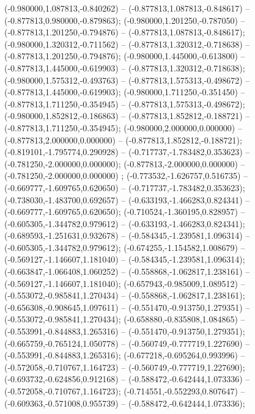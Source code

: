  (-0.980000,1.087813,-0.840262) -- (-0.877813,1.087813,-0.848617) -- (-0.877813,0.980000,-0.879863);
 (-0.980000,1.201250,-0.787050) -- (-0.877813,1.201250,-0.794876) -- (-0.877813,1.087813,-0.848617);
 (-0.980000,1.320312,-0.711562) -- (-0.877813,1.320312,-0.718638) -- (-0.877813,1.201250,-0.794876);
 (-0.980000,1.445000,-0.613800) -- (-0.877813,1.445000,-0.619903) -- (-0.877813,1.320312,-0.718638);
 (-0.980000,1.575312,-0.493763) -- (-0.877813,1.575313,-0.498672) -- (-0.877813,1.445000,-0.619903);
 (-0.980000,1.711250,-0.351450) -- (-0.877813,1.711250,-0.354945) -- (-0.877813,1.575313,-0.498672);
 (-0.980000,1.852812,-0.186863) -- (-0.877813,1.852812,-0.188721) -- (-0.877813,1.711250,-0.354945);
 (-0.980000,2.000000,0.000000) -- (-0.877813,2.000000,0.000000) -- (-0.877813,1.852812,-0.188721);
 (-0.819101,-1.795774,0.290928) -- (-0.717737,-1.783482,0.353623) -- (-0.781250,-2.000000,0.000000);
 (-0.877813,-2.000000,0.000000) -- (-0.781250,-2.000000,0.000000) ;
 (-0.773532,-1.626757,0.516735) -- (-0.669777,-1.609765,0.620650) -- (-0.717737,-1.783482,0.353623);
 (-0.738030,-1.483700,0.692657) -- (-0.633193,-1.466283,0.824341) -- (-0.669777,-1.609765,0.620650);
 (-0.710524,-1.360195,0.828957) -- (-0.605305,-1.344782,0.979612) -- (-0.633193,-1.466283,0.824341);
 (-0.689593,-1.251631,0.932678) -- (-0.584345,-1.239581,1.096314) -- (-0.605305,-1.344782,0.979612);
 (-0.674255,-1.154582,1.008679) -- (-0.569127,-1.146607,1.181040) -- (-0.584345,-1.239581,1.096314);
 (-0.663847,-1.066408,1.060252) -- (-0.558868,-1.062817,1.238161) -- (-0.569127,-1.146607,1.181040);
 (-0.657943,-0.985009,1.089512) -- (-0.553072,-0.985841,1.270434) -- (-0.558868,-1.062817,1.238161);
 (-0.656308,-0.908645,1.097611) -- (-0.551470,-0.913750,1.279351) -- (-0.553072,-0.985841,1.270434);
 (-0.658880,-0.835808,1.084865) -- (-0.553991,-0.844883,1.265316) -- (-0.551470,-0.913750,1.279351);
 (-0.665759,-0.765124,1.050778) -- (-0.560749,-0.777719,1.227690) -- (-0.553991,-0.844883,1.265316);
 (-0.677218,-0.695264,0.993996) -- (-0.572058,-0.710767,1.164723) -- (-0.560749,-0.777719,1.227690);
 (-0.693732,-0.624856,0.912168) -- (-0.588472,-0.642444,1.073336) -- (-0.572058,-0.710767,1.164723);
 (-0.714551,-0.552293,0.807647) -- (-0.609363,-0.571008,0.955739) -- (-0.588472,-0.642444,1.073336);
